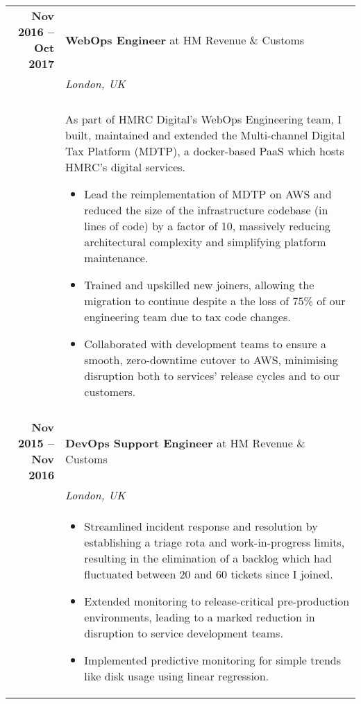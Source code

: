 \documentclass[a4paper,10pt]{article} %
\begin{document}
\begin{tabularx}{\textwidth}{r|X}
\textbf{Nov 2016 -- Oct 2017}        & \textbf{WebOps Engineer} at HM Revenue \& Customs \\
                                    & \emph{London, UK} \\
                                    & \\
                                    & \footnotesize
    {As part of HMRC Digital's WebOps Engineering team, I built, maintained and
    extended the Multi-channel Digital Tax Platform (MDTP), a docker-based PaaS
    which hosts HMRC's digital services.
    \begin{itemize}
    \item Lead the reimplementation of MDTP on AWS and reduced the size of the
        infrastructure codebase (in lines of code) by a factor of 10, massively
        reducing architectural complexity and simplifying platform maintenance.
    \item Trained and upskilled new joiners, allowing the migration to continue
        despite a the loss of 75\% of our engineering team due to tax code
        changes.
    \item Collaborated with development teams to ensure a smooth, zero-downtime
        cutover to AWS, minimising disruption both to services' release cycles
        and to our customers.
    \end{itemize}}\\

\multicolumn{2}{r}{} \\ %

\textbf{Nov 2015 -- Nov 2016}       & \textbf{DevOps Support Engineer} at HM Revenue \& Customs \\
                                    & \emph{London, UK} \\
                                    & \footnotesize
    {\begin{itemize}[after=\vspace{-2\baselineskip}]
    \item Streamlined incident response and resolution by establishing a triage
    rota and work-in-progress limits, resulting in the elimination of a backlog
    which had fluctuated between 20 and 60 tickets since I joined.
    \item Extended monitoring to release-critical pre-production environments,
        leading to a marked reduction in disruption to service development
        teams.
    \item Implemented predictive monitoring for simple trends like disk usage
    using linear regression.
    \end{itemize}}\\


\end{tabularx}
\end{document}
